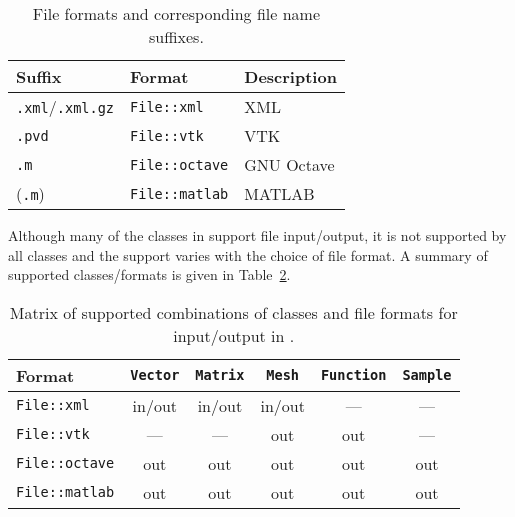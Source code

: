 \begin{table}[htbp]
  \begin{center}
    \begin{tabular}{|l|l|l|}
      \hline
      Suffix & Format & Description \\
      \hline
      \hline
      \texttt{.xml}/\texttt{.xml.gz} & \texttt{File::xml} & \dolfin{} XML \\
      \hline
      \texttt{.pvd} & \texttt{File::vtk} & VTK \\
      \hline
      \texttt{.m} & \texttt{File::octave} & GNU Octave \\
      \hline
      (\texttt{.m}) & \texttt{File::matlab} & MATLAB \\
      \hline
    \end{tabular}
    \caption{File formats and corresponding file name suffixes.}
    \label{tab:formats}
  \end{center}
\end{table}

Although many of the classes in \dolfin{} support file input/output,
it is not supported by all classes and the support varies with the
choice of file format. A summary of supported classes/formats is
given in Table~\ref{tab:classes,formats}.


\begin{table}[htbp]
  \begin{center}
    \begin{tabular}{|l||c|c|c|c|c|}
      \hline
      Format           & \texttt{Vector} & \texttt{Matrix} & \texttt{Mesh} & \texttt{Function} & \texttt{Sample} \\
      \hline
      \hline
      \texttt{File::xml}     & in/out & in/out & in/out & --- & --- \\
      \hline
      \texttt{File::vtk}     & ---    & ---    & out    & out & --- \\
      \hline
      \texttt{File::octave}  & out    & out    & out    & out & out \\
      \hline
      \texttt{File::matlab}  & out    & out    & out    & out & out \\
      \hline
    \end{tabular}
    \caption{Matrix of supported combinations of classes and file
      formats for input/output in \dolfin{}.}
    \label{tab:classes,formats}
  \end{center}
\end{table}

